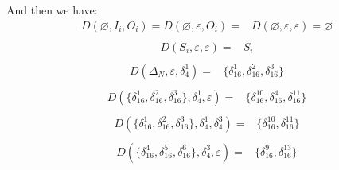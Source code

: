 \documentclass[letterpaper, 10 pt, conference]{ieeeconf}  %
\begin{document}
And then we have:
\begin{equation}
\begin{split}
D\left(\varnothing,I_i,O_i\right)=D\left(\varnothing,\varepsilon,O_i\right)=&D\left(\varnothing,\varepsilon,\varepsilon\right)=\varnothing\\
\end{split}
\end{equation}
\begin{equation}
\begin{split}
D\left(S_i,\varepsilon,\varepsilon\right)=&S_i\\
\end{split}
\end{equation}
\begin{equation}
\begin{split}
D\left(\Delta_N,\varepsilon,\delta_4^1\right)=&\{\delta_{16}^1,\delta_{16}^2,\delta_{16}^3\}\\
\end{split}
\end{equation}
\begin{equation}
\begin{split}
D\left(\{\delta_{16}^1,\delta_{16}^2,\delta_{16}^3\},\delta_4^1,\varepsilon\right)=&\{\delta_{16}^{10},\delta_{16}^4,\delta_{16}^{11}\}\\
\end{split}
\end{equation}
\begin{equation}
\begin{split}
D\left(\{\delta_{16}^1,\delta_{16}^2,\delta_{16}^3\},\delta_4^1,\delta_4^3\right)=&\{\delta_{16}^{10},\delta_{16}^{11}\}\\
\end{split}
\end{equation}
\begin{equation}
\begin{split}
D\left(\{\delta_{16}^4,\delta_{16}^5,\delta_{16}^6\},\delta_4^3,\varepsilon\right)=&\{\delta_{16}^9,\delta_{16}^{13}\}
\end{split}
\end{equation}
\end{document}
